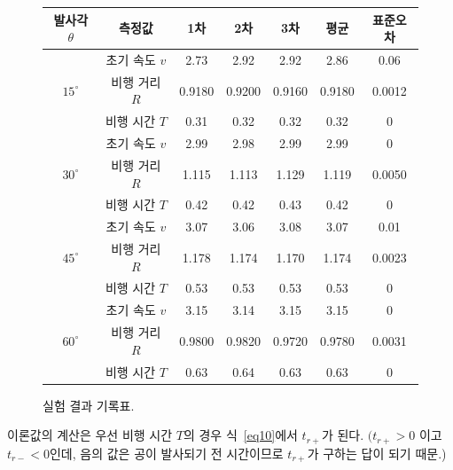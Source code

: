 \documentclass[12pt,a4paper]{article}
\begin{document}
\begin{figure}[hbt!]
    \centering
    \begin{tabular}{|c|c|c|c|c|c|c|}
        \hline
        발사각 $\theta$ & 측정값 & 1차 & 2차 & 3차 & 평균 & 표준오차 \\
        \hline
        \multirow{3}{*}{$15^{\circ}$} & 초기 속도 $v$ & 2.73 & 2.92 & 2.92 & 2.86 & 0.06\\
        \cline{2-7}
                                      & 비행 거리 $R$ & 0.9180 & 0.9200 & 0.9160 & 0.9180 & 0.0012\\
        \cline{2-7}
                                      & 비행 시간 $T$ & 0.31 & 0.32 & 0.32 & 0.32 & 0\\
        \hline
        \multirow{3}{*}{$30^{\circ}$} & 초기 속도 $v$ & 2.99 & 2.98 & 2.99 & 2.99 & 0\\
        \cline{2-7}
                                      & 비행 거리 $R$ & 1.115 & 1.113 & 1.129 & 1.119 & 0.0050\\
        \cline{2-7}
                                      & 비행 시간 $T$ & 0.42 & 0.42 & 0.43 & 0.42 & 0\\
        \hline
        \multirow{3}{*}{$45^{\circ}$} & 초기 속도 $v$ & 3.07 & 3.06 & 3.08 & 3.07 & 0.01\\
        \cline{2-7}
                                      & 비행 거리 $R$ & 1.178 & 1.174 & 1.170 & 1.174 & 0.0023\\
        \cline{2-7}
                                      & 비행 시간 $T$ & 0.53 & 0.53 & 0.53 & 0.53 & 0\\
        \hline
        \multirow{3}{*}{$60^{\circ}$} & 초기 속도 $v$ & 3.15 & 3.14 & 3.15 & 3.15 & 0\\
        \cline{2-7}
                                      & 비행 거리 $R$ & 0.9800 & 0.9820 & 0.9720 & 0.9780 & 0.0031\\
        \cline{2-7}
                                      & 비행 시간 $T$ & 0.63 & 0.64 & 0.63 & 0.63 & 0\\
        \hline
    \end{tabular}
    \caption{\label{fig9} 실험 결과 기록표.}
\end{figure}
이론값의 계산은 우선 비행 시간 $T$의 경우 식~\ref{eq10}에서 $t_{r+}$가 된다. $(t_{r+} > 0$ 이고 $t_{r-} < 0$인데, 음의 값은 공이 발사되기
전 시간이므로 $t_{r+}$가 구하는 답이 되기 때문.)
\end{document}
